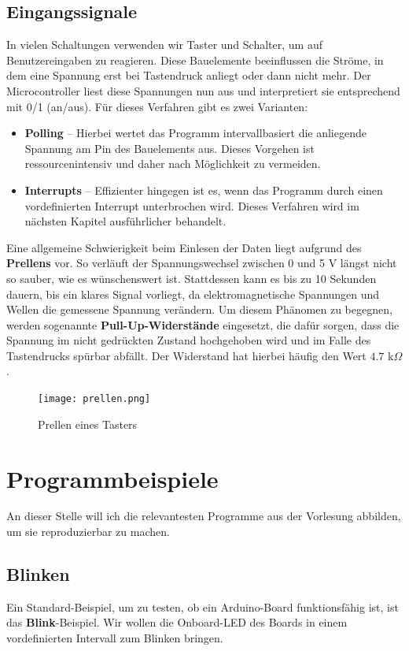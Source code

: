 \documentclass[11pt,a4paper]{scrartcl}
\begin{document}
\subsection{Eingangssignale}
In vielen Schaltungen verwenden wir Taster und Schalter, um auf Benutzereingaben zu reagieren. Diese Bauelemente beeinflussen die Ströme, in dem eine Spannung erst bei Tastendruck anliegt oder dann nicht mehr. Der Microcontroller liest diese Spannungen nun aus und interpretiert sie entsprechend mit 0/1 (an/aus). Für dieses Verfahren gibt es zwei Varianten:
\begin{itemize}
\item \textbf{Polling} -- Hierbei wertet das Programm intervallbasiert die anliegende Spannung am Pin des Bauelements aus. Dieses Vorgehen ist ressourcenintensiv und daher nach Möglichkeit zu vermeiden.
\item \textbf{Interrupts} -- Effizienter hingegen ist es, wenn das Programm durch einen vordefinierten Interrupt unterbrochen wird. Dieses Verfahren wird im nächsten Kapitel ausführlicher behandelt.
\end{itemize}
Eine allgemeine Schwierigkeit beim Einlesen der Daten liegt aufgrund des \textbf{Prellens} vor. So verläuft der Spannungswechsel zwischen 0 und 5 V längst nicht so sauber, wie es wünschenswert ist. Stattdessen kann es bis zu 10 Sekunden dauern, bis ein klares Signal vorliegt,
 da elektromagnetische Spannungen und Wellen die gemessene Spannung verändern. Um diesem Phänomen zu begegnen, werden sogenannte \textbf{Pull-Up-Widerstände} eingesetzt, die dafür sorgen, dass die Spannung im nicht gedrückten Zustand {\glqq}hochgehoben{\grqq} wird und im Falle des Tastendrucks spürbar abfällt. Der Widerstand hat hierbei häufig den Wert $4.7 \text{ k}\Omega$.
\begin{figure}[h!]
\centering
\texttt{[image: prellen.png]}
\caption{Prellen eines Tasters}
\end{figure}
\section{Programmbeispiele}
An dieser Stelle will ich die relevantesten Programme aus der Vorlesung abbilden, um sie reproduzierbar zu machen.
\subsection{Blinken}
Ein Standard-Beispiel, um zu testen, ob ein Arduino-Board funktionsfähig ist, ist das \textbf{Blink}-Beispiel. Wir wollen die Onboard-LED des Boards in einem vordefinierten Intervall zum Blinken bringen.
\end{document}
